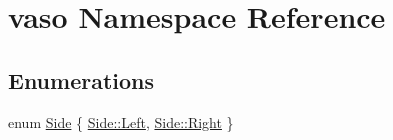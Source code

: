 \hypertarget{namespacevaso}{\section{vaso Namespace Reference}
\label{namespacevaso}
}
\subsection*{Enumerations}
\begin{DoxyCompactItemize}
\item 
enum \hyperlink{namespacevaso_a77c5d9704657d49d456f691ddd8abf7c}{Side} \{ \hyperlink{namespacevaso_a77c5d9704657d49d456f691ddd8abf7ca945d5e233cf7d6240f6b783b36a374ff}{Side\+::\+Left}, 
\hyperlink{namespacevaso_a77c5d9704657d49d456f691ddd8abf7ca92b09c7c48c520c3c55e497875da437c}{Side\+::\+Right}
 \}
\end{DoxyCompactItemize}
